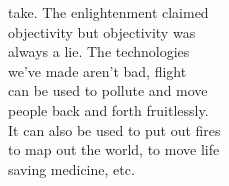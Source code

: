 \documentclass{report}
\begin{document}
\begin{description}
\begin{mdframed}
\begin{itemize}
\begin{center}
{                            take. The enlightenment claimed\\
                            objectivity but objectivity was\\
                            always a lie. The technologies\\
                            we've made aren't bad, flight\\
                            can be used to pollute and move\\
                            people back and forth fruitlessly.\\
                            It can also be used to put out fires\\
                            to map out the world, to move life\\
                            saving medicine, etc.\\
                            \vspace{10pt}

}
\end{center}
\end{itemize}
\end{mdframed}
\end{description}
\end{document}
